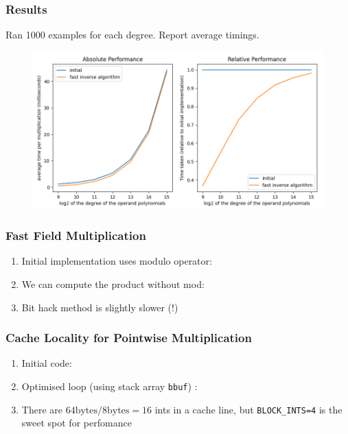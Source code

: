 \documentclass{beamer}
\begin{document}
\begin{frame}
    \frametitle{Results}
    
    Ran 1000 examples for each degree. Report average timings.

    \begin{figure}
        \includegraphics[width=\textwidth]{fastinv.png}
    \end{figure}
\end{frame}

\begin{frame}
    \frametitle{Fast Field Multiplication}

    \begin{enumerate}[label=(\roman*)]
        \item Initial implementation uses modulo operator:
             \pause \smallbreak
        \item We can compute the product without mod:
             \pause \smallbreak
        \item Bit hack method is slightly slower (!)
    \end{enumerate}
\end{frame}

\begin{frame}
    \frametitle{Cache Locality for Pointwise Multiplication}

    \begin{enumerate}[label=(\roman*)]
        \item Initial code:
            
            \pause \smallbreak
        \item Optimised loop (using stack array \texttt{bbuf}) \pause:
            
            \pause \smallbreak
        \item There are $64\text{bytes}/8\text{bytes} = 16$ ints in a cache
            line, but \texttt{BLOCK\_INTS=4} is the sweet spot for perfomance
    \end{enumerate}
\end{frame}
\end{document}

